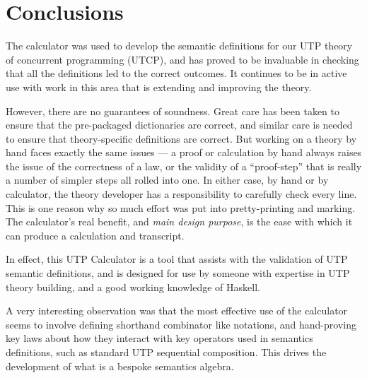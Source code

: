 \section{Conclusions}\label{sec:Conc}
The calculator was used to develop the semantic definitions
for our UTP theory of concurrent programming (UTCP),
and has proved to be invaluable in checking that all
the definitions led to the correct outcomes.
It continues to be in active use with work in this area
that is extending and improving the theory.

However, there are no guarantees of soundness.
Great care has been taken to ensure that the pre-packaged
dictionaries are correct,
and similar care is needed to ensure that theory-specific
definitions are correct.
But working on a theory by hand faces exactly the same issues
--- a proof or calculation by hand always raises the issue
of the correctness of a law, or the validity of a ``proof-step''
that is really a number of simpler steps all rolled into one.
In either case, by hand or by calculator,
the theory developer has a responsibility to carefully check every line.
This is one reason why so much effort was put into pretty-printing
and marking.
The calculator's real benefit, and\emph{ main design purpose},
is the ease with which
it can produce a calculation and transcript.

In effect, this UTP Calculator is a tool that assists
with the validation of UTP semantic definitions,
and is designed for use by someone with expertise
in UTP theory building,
and a good working knowledge of Haskell.


A very interesting observation was that the most effective use
of the calculator seems to involve defining shorthand
combinator like notations, and hand-proving key laws
about how they interact with key operators used
in semantics definitions, such as standard UTP sequential composition.
This drives the development of what is a bespoke semantics algebra.



